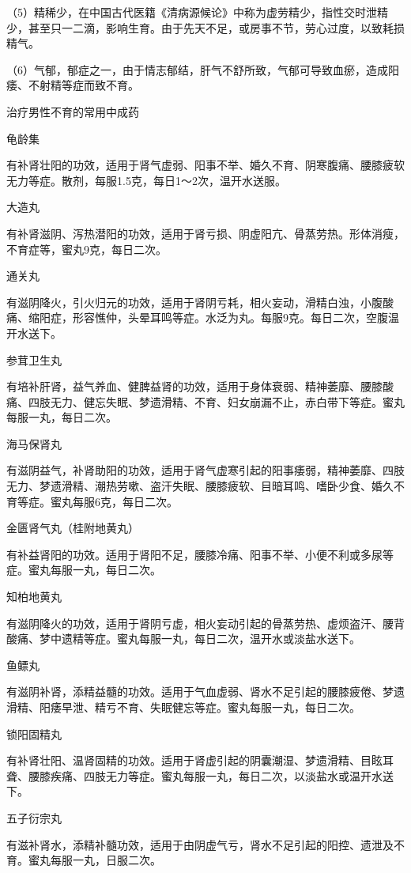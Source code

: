\documentclass[12pt,UTF8,openany]{ctexbook}
\begin{document}
（5）精稀少，在中国古代医籍《清病源候论》中称为虚劳精少，指性交时泄精少，甚至只一二滴，影响生育。由于先天不足，或房事不节，劳心过度，以致耗损精气。

（6）气郁，郁症之一，由于情志郁结，肝气不舒所致，气郁可导致血瘀，造成阳痿、不射精等症而致不育。





治疗男性不育的常用中成药


龟龄集

有补肾壮阳的功效，适用于肾气虚弱、阳事不举、婚久不育、阴寒腹痛、腰膝疲软无力等症。散剂，每服1.5克，每日1～2次，温开水送服。

大造丸

有补肾滋阴、泻热潜阳的功效，适用于肾亏损、阴虚阳亢、骨蒸劳热。形体消瘦，不育症等，蜜丸9克，每日二次。

通关丸

有滋阴降火，引火归元的功效，适用于肾阴亏耗，相火妄动，滑精白浊，小腹酸痛、缩阳症，形容憔仲，头晕耳鸣等症。水泛为丸。每服9克。每日二次，空腹温开水送下。

参茸卫生丸

有培补肝肾，益气养血、健脾益肾的功效，适用于身体衰弱、精神萎靡、腰膝酸痛、四肢无力、健忘失眠、梦遗滑精、不育、妇女崩漏不止，赤白带下等症。蜜丸每服一丸，每日二次。

海马保肾丸

有滋阴益气，补肾助阳的功效，适用于肾气虚寒引起的阳事痿弱，精神萎靡、四肢无力、梦遗滑精、潮热劳嗽、盗汗失眠、腰膝疲软、目暗耳鸣、嗜卧少食、婚久不育等症。蜜丸每服6克，每日二次。

金匮肾气丸（桂附地黄丸）

有补益肾阳的功效。适用于肾阳不足，腰膝冷痛、阳事不举、小便不利或多尿等症。蜜丸每服一丸，每日二次。

知柏地黄丸

有滋阴降火的功效，适用于肾阴亏虚，相火妄动引起的骨蒸劳热、虚烦盗汗、腰背酸痛、梦中遗精等症。蜜丸每服一丸，每日二次，温开水或淡盐水送下。

鱼鳔丸

有滋阴补肾，添精益髓的功效。适用于气血虚弱、肾水不足引起的腰膝疲倦、梦遗滑精、阳痿早泄、精亏不育、失眠健忘等症。蜜丸每服一丸，每日二次。

锁阳固精丸

有补肾壮阳、温肾固精的功效。适用于肾虚引起的阴囊潮湿、梦遗滑精、目眩耳聋、腰膝疾痛、四肢无力等症。蜜丸每服一丸，每日二次，以淡盐水或温开水送下。

五子衍宗丸

有滋补肾水，添精补髓功效，适用于由阴虚气亏，肾水不足引起的阳控、遗泄及不育。蜜丸每服一丸，日服二次。
\end{document}
